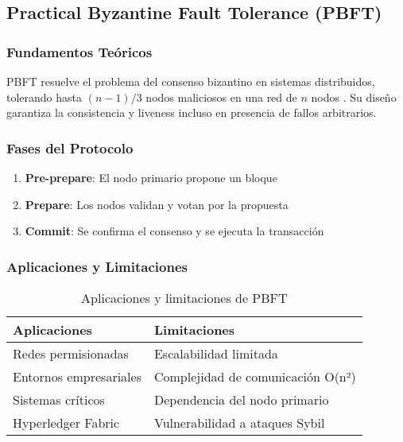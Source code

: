 \subsection{Practical Byzantine Fault Tolerance (PBFT)}

\subsubsection{Fundamentos Teóricos}

PBFT resuelve el problema del consenso bizantino en sistemas distribuidos, tolerando hasta $(n-1)/3$ nodos maliciosos en una red de $n$ nodos \cite{castro1999practical}. Su diseño garantiza la consistencia y liveness incluso en presencia de fallos arbitrarios.

\subsubsection{Fases del Protocolo}

\begin{enumerate}
    \item \textbf{Pre-prepare}: El nodo primario propone un bloque
    \item \textbf{Prepare}: Los nodos validan y votan por la propuesta
    \item \textbf{Commit}: Se confirma el consenso y se ejecuta la transacción
\end{enumerate}

\subsubsection{Aplicaciones y Limitaciones}

\begin{table}[h]
\centering
\begin{tabular}{|p{6cm}|p{6cm}|}
\hline
\textbf{Aplicaciones} & \textbf{Limitaciones} \\
\hline
Redes permisionadas & Escalabilidad limitada \\
Entornos empresariales & Complejidad de comunicación O(n²) \\
Sistemas críticos & Dependencia del nodo primario \\
Hyperledger Fabric & Vulnerabilidad a ataques Sybil \\
\hline
\end{tabular}
\caption{Aplicaciones y limitaciones de PBFT}
\label{tab:pbft-comparison}
\end{table}

